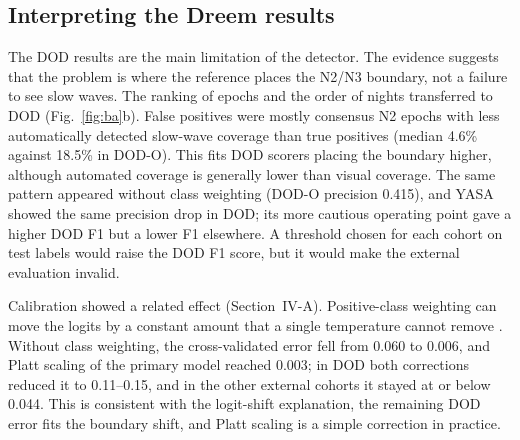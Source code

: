 \subsection{Interpreting the Dreem results}
\label{sec:dod}
The DOD results are the main limitation of the detector. The evidence suggests that the problem is where the reference places the N2/N3 boundary, not a failure to see slow waves. The ranking of epochs and the order of nights transferred to DOD (Fig.~\ref{fig:ba}b). False positives were mostly consensus N2 epochs with less automatically detected slow-wave coverage than true positives (median 4.6\% against 18.5\% in DOD-O). This fits DOD scorers placing the boundary higher, although automated coverage is generally lower than visual coverage. The same pattern appeared without class weighting (DOD-O precision 0.415), and YASA showed the same precision drop in DOD; its more cautious operating point gave a higher DOD F1 but a lower F1 elsewhere. A threshold chosen for each cohort on test labels would raise the DOD F1 score, but it would make the external evaluation invalid. %

Calibration showed a related effect (Section~IV-A). Positive-class weighting can move the logits by a constant amount that a single temperature cannot remove \cite{guo2017calibration}. Without class weighting, the cross-validated error fell from 0.060 to 0.006, and Platt scaling of the primary model reached 0.003; in DOD both corrections reduced it to 0.11--0.15, and in the other external cohorts it stayed at or below 0.044. This is consistent with the logit-shift explanation, the remaining DOD error fits the boundary shift, and Platt scaling is a simple correction in practice. %

